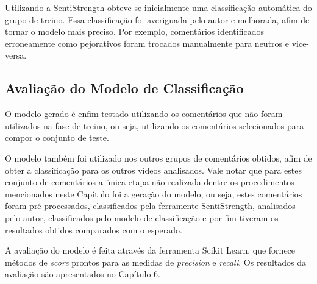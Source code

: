 Utilizando a SentiStrength obteve-se inicialmente uma classificação automática do grupo de treino. Essa classificação foi averiguada pelo autor e melhorada, afim de tornar o modelo mais preciso. Por exemplo, comentários identificados erroneamente como pejorativos foram trocados manualmente para neutros e vice-versa.

\subsection{Avaliação do Modelo de Classificação}

O modelo gerado é enfim testado utilizando os comentários que não foram utilizados na fase de treino, ou seja, utilizando os comentários selecionados para compor o conjunto de teste. 

O modelo também foi utilizado nos outros grupos de comentários obtidos, afim de obter a classificação para os outros vídeos analisados. Vale notar que para estes conjunto de comentários a única etapa não realizada dentre os procedimentos mencionados neste Capítulo foi a geração do modelo, ou seja, estes comentários foram pré-processados, classificados pela ferramente SentiStrength, analisados pelo autor, classificados pelo modelo de classificação e por fim tiveram os resultados obtidos comparados com o esperado.

A avaliação do modelo é feita através da ferramenta Scikit Learn, que fornece métodos de \textit{score} prontos para as medidas de \textit{precision} e \textit{recall}. Os resultados da avaliação são apresentados no Capítulo 6.

